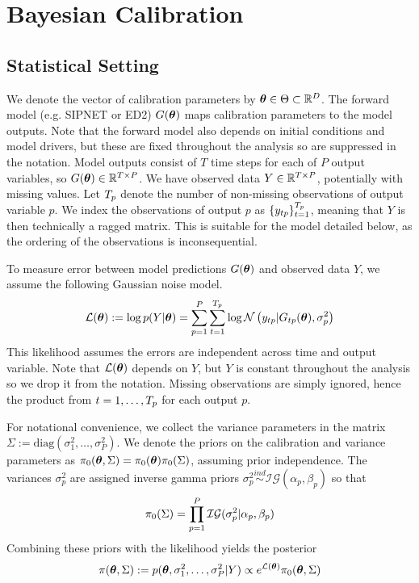 \documentclass[12pt]{article}
\begin{document}
\section{Bayesian Calibration}

\subsection{Statistical Setting}
We denote the vector of calibration parameters by $\boldsymbol{\theta} \in \Theta \subset \mathbb{R}^{D}$. The forward model (e.g. SIPNET or ED2) $G(\boldsymbol{\theta})$ maps calibration parameters to the model outputs. Note that the forward 
model also depends on initial conditions and model drivers, but these are fixed throughout the analysis so are suppressed in the notation. Model outputs consist 
of $T$ time steps for each of $P$ output variables, so $G(\boldsymbol{\theta}) \in \mathbb{R}^{T \times P}$. We have observed data $Y \in \mathbb{R}^{T \times P}$, potentially with missing values. Let $T_{p}$ denote the number 
of non-missing observations of output variable $p$. We index the observations of output $p$ as $\{y_{tp}\}_{t = 1}^{T_{p}}$, meaning that $Y$ is then technically a ragged matrix. 
This is suitable for the model detailed below, as the ordering of the observations is inconsequential. 

To measure error between model 
predictions $G(\boldsymbol{\theta})$ and observed data $Y$, we assume the following Gaussian noise model. 
\begin{align*}
\mathcal{L}(\boldsymbol{\theta}) := \log p(Y|\mathbf{\boldsymbol{\theta}}) = \sum_{p = 1}^{P} \sum_{t = 1}^{T_{p}} \log \mathcal{N}\left(y_{tp}| G_{tp}(\boldsymbol{\theta}), \sigma_p^2 \right)
\end{align*}
This likelihood assumes the errors are independent across time and output variable. Note that $\mathcal{L}(\boldsymbol{\theta})$ depends on $Y$, but $Y$ is constant throughout the analysis so we drop it from the notation. Missing 
observations are simply ignored, hence the product from $t = 1, \dots, T_{p}$ for each output $p$.

For notational convenience, we collect the variance parameters in the matrix $\Sigma := \text{diag}\left(\sigma_1^2, \dots, \sigma_P^2 \right)$. 
We denote the priors on the calibration and variance parameters as  $\pi_0(\boldsymbol{\theta}, \Sigma) = \pi_0(\boldsymbol{\theta})\pi_0(\Sigma)$, assuming prior independence.  
The variances $\sigma_p^2$ are assigned inverse gamma priors $\sigma_p^2 \overset{ind}{\sim} \mathcal{IG}(\alpha_p, \beta_p)$ so that 
\[\pi_0(\Sigma) = \prod_{p = 1}^{P} \mathcal{IG}(\sigma_p^2|\alpha_p, \beta_p)\]
Combining these priors with the likelihood yields the posterior 
\[\pi(\boldsymbol{\theta}, \Sigma) := p(\boldsymbol{\theta}, \sigma_1^2, \dots, \sigma_P^2|Y) \propto e^{\mathcal{L}(\boldsymbol{\theta})}\pi_0(\boldsymbol{\theta}, \Sigma)\]
\end{document}
